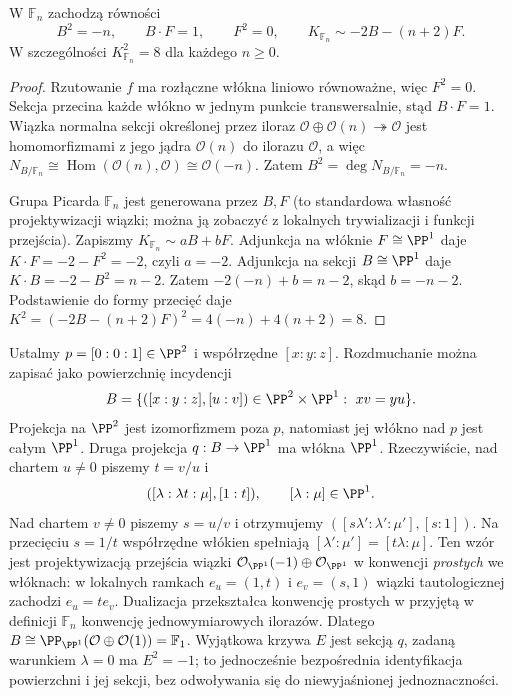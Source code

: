 \begin{stwierdzenie}
\label{st:ga6-hirzebruch}
W $\mathbb F_n$ zachodzą równości
\[
 B^2=-n,\qquad B\cdot F=1,\qquad F^2=0,
 \qquad K_{\mathbb F_n}\sim-2B-(n+2)F.
\]
W szczególności $K_{\mathbb F_n}^2=8$ dla każdego $n\ge0$.
\end{stwierdzenie}
\begin{proof}
Rzutowanie $f$ ma rozłączne włókna liniowo równoważne,
więc $F^2=0$. Sekcja przecina każde włókno w jednym
punkcie transwersalnie, stąd $B\cdot F=1$.
Wiązka normalna sekcji określonej przez iloraz
$\mathcal O\oplus\mathcal O(n)\twoheadrightarrow\mathcal O$
jest homomorfizmami z jego jądra $\mathcal O(n)$
do ilorazu $\mathcal O$, a więc
$N_{B/\mathbb F_n}\cong\operatorname{Hom}
(\mathcal O(n),\mathcal O)\cong\mathcal O(-n)$.
Zatem $B^2=\deg N_{B/\mathbb F_n}=-n$.

Grupa Picarda $\mathbb F_n$ jest generowana przez
$B,F$ (to standardowa własność projektywizacji
wiązki; można ją zobaczyć z lokalnych trywializacji
i funkcji przejścia). Zapiszmy
$K_{\mathbb F_n}\sim aB+bF$. Adjunkcja na włóknie
$F\cong\PP^1$ daje $K\cdot F=-2-F^2=-2$,
czyli $a=-2$. Adjunkcja na sekcji $B\cong\PP^1$
daje $K\cdot B=-2-B^2=n-2$.
Zatem $-2(-n)+b=n-2$, skąd $b=-n-2$.
Podstawienie do formy przecięć daje
$K^2=(-2B-(n+2)F)^2=4(-n)+4(n+2)=8$.
\end{proof}

\begin{przyklad}
\label{prz:ga6-f1}
Ustalmy $p=[0:0:1]\in\PP^2$ i współrzędne $[x:y:z]$.
Rozdmuchanie można zapisać jako powierzchnię incydencji
\[
B=\{([x:y:z],[u:v])\in\PP^2\times\PP^1:\ xv=yu\}.
\]
Projekcja na $\PP^2$ jest izomorfizmem poza $p$, natomiast
jej włókno nad $p$ jest całym $\PP^1$.
Druga projekcja $q:B\to\PP^1$ ma włókna $\PP^1$.
Rzeczywiście, nad chartem $u\ne0$ piszemy $t=v/u$ i
\[
([\lambda:\lambda t:\mu],[1:t]),\qquad[\lambda:\mu]\in\PP^1.
\]
Nad chartem $v\ne0$ piszemy $s=u/v$ i otrzymujemy
$([s\lambda':\lambda':\mu'],[s:1])$.
Na przecięciu $s=1/t$ współrzędne włókien spełniają
$[\lambda':\mu']=[t\lambda:\mu]$. Ten wzór jest
projektywizacją przejścia wiązki
$\mathcal O_{\PP^1}(-1)\oplus\mathcal O_{\PP^1}$
w konwencji \emph{prostych} we włóknach: w lokalnych
ramkach $e_u=(1,t)$ i $e_v=(s,1)$ wiązki tautologicznej
zachodzi $e_u=t e_v$.
Dualizacja przekształca konwencję prostych w przyjętą
w definicji $\mathbb F_n$ konwencję jednowymiarowych ilorazów.
Dlatego
$B\cong\PP_{\PP^1}(\mathcal O\oplus\mathcal O(1))=\mathbb F_1$.
Wyjątkowa krzywa $E$ jest sekcją $q$, zadaną warunkiem
$\lambda=0$ ma $E^2=-1$; to jednocześnie
bezpośrednia identyfikacja powierzchni i jej sekcji,
bez odwoływania się do niewyjaśnionej jednoznaczności.
\end{przyklad}

